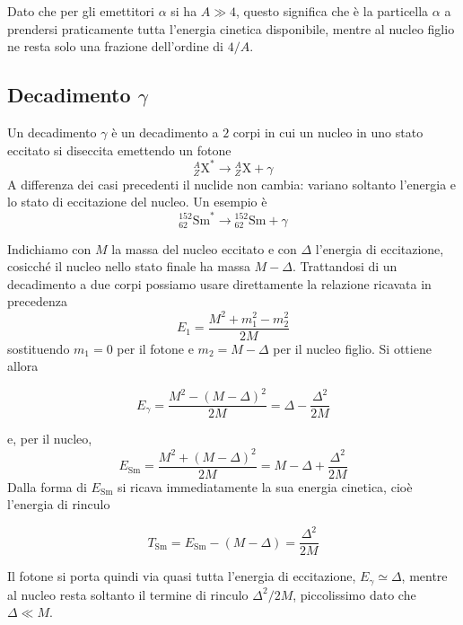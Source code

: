Dato che per gli emettitori $\alpha$ si ha $A \gg 4$, questo significa che è la particella $\alpha$ a prendersi praticamente tutta l'energia cinetica disponibile, mentre al nucleo figlio ne resta solo una frazione dell'ordine di $4/A$.

\subsection{Decadimento $\gamma$}

Un decadimento $\gamma$ è un decadimento a $2$ corpi in cui un nucleo in uno stato eccitato si diseccita emettendo un fotone
%
\begin{equation*}
    {}^{A}_{Z}\mathrm{X}^* \longrightarrow {}^{A}_{Z}\mathrm{X} + \gamma
\end{equation*}
A differenza dei casi precedenti il nuclide non cambia: variano soltanto l'energia e lo stato di eccitazione del nucleo. Un esempio è
%
\begin{equation*}
    {}^{152}_{62}\mathrm{Sm}^* \longrightarrow {}^{152}_{62}\mathrm{Sm} + \gamma
\end{equation*}

Indichiamo con $M$ la massa del nucleo eccitato e con $\Delta$ l'energia di eccitazione, cosicché il nucleo nello stato finale ha massa $M - \Delta$. Trattandosi di un decadimento a due corpi possiamo usare direttamente la relazione ricavata in precedenza
%
\begin{equation*}
    E_1 = \frac{M^2 + m_1^2 - m_2^2}{2M}
\end{equation*}
sostituendo $m_1 = 0$ per il fotone e $m_2 = M - \Delta$ per il nucleo figlio. Si ottiene allora
%
\begin{tcolorbox}[colback=black!5!white, colframe=black!45!white, boxrule=0.8pt]
\begin{equation}
    E_{\gamma} = \frac{M^2 - (M-\Delta)^2}{2M} = \Delta - \frac{\Delta^2}{2M}
\end{equation}
\end{tcolorbox}
e, per il nucleo,
%
\begin{equation}
    E_{\mathrm{Sm}} = \frac{M^2 + (M-\Delta)^2}{2M} = M - \Delta + \frac{\Delta^2}{2M}
\end{equation}
Dalla forma di $E_{\mathrm{Sm}}$ si ricava immediatamente la sua energia cinetica, cioè l'energia di rinculo
%
\begin{tcolorbox}[colback=black!5!white, colframe=black!45!white, boxrule=0.8pt]
\begin{equation}
    T_{\mathrm{Sm}} = E_{\mathrm{Sm}} - (M - \Delta) = \frac{\Delta^2}{2M}
\end{equation}
\end{tcolorbox}
Il fotone si porta quindi via quasi tutta l'energia di eccitazione, $E_{\gamma} \simeq \Delta$, mentre al nucleo resta soltanto il termine di rinculo $\Delta^2/2M$, piccolissimo dato che $\Delta \ll M$.

